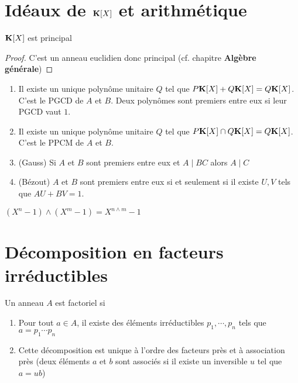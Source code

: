 \section{Idéaux de \texorpdfstring{$\mathbf K[X]$}{K[X]} et arithmétique}

\begin{thm}
    $\mathbf K[X]$ est principal
\end{thm}
\begin{proof}
    C'est un anneau euclidien donc principal (cf. chapitre \textbf{Algèbre générale})
\end{proof}

\begin{thmdef}
    \begin{enumerate}
        \item Il existe un unique polynôme unitaire $Q$ tel que $P\mathbf K[X]+Q\mathbf K[X]=Q\mathbf K[X]$. C'est le PGCD de $A$ et $B$. Deux polynômes sont premiers entre eux si leur PGCD vaut $1$.
        \item Il existe un unique polynôme unitaire $Q$ tel que $P\mathbf K[X]\cap Q\mathbf K[X]=Q\mathbf K[X]$. C'est le PPCM de $A$ et $B$.
        \item (Gauss)  Si $A$ et $B$ sont premiers entre eux et $A\;|\;BC$ alors $A\;|\;C$
        \item (Bézout)  $A$ et $B$ sont premiers entre eux si et seulement si il existe $U, V$ tels que $AU+BV=1$.
    \end{enumerate}
\end{thmdef}

\begin{ex}
    $(X^n-1)\land (X^m-1)=X^{n\land m}-1$
\end{ex}

\section{Décomposition en facteurs irréductibles}

\begin{dfn}
    Un anneau $A$ est factoriel si \begin{enumerate}
        \item Pour tout $a\in A$, il existe des éléments irréductibles $p_1, \cdots, p_n$ tels que $a=p_1\cdots p_n$
        \item Cette décomposition est unique à l'ordre des facteurs près et à association près (deux éléments $a$ et $b$ sont associés si il existe un inversible $u$ tel que $a=ub$)
    \end{enumerate}
\end{dfn}

